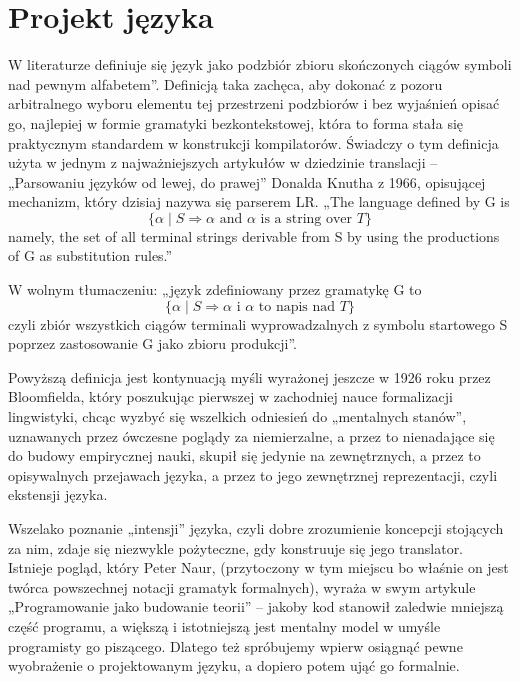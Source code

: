 \chapter{Projekt języka}
\label{cha:wywodJezyka}
W literaturze definiuje się język jako podzbiór zbioru skończonych ciągów symboli nad pewnym alfabetem”\cite{hopcroft_automaty}. Definicją taka zachęca, aby dokonać z pozoru arbitralnego wyboru elementu tej przestrzeni podzbiorów i bez wyjaśnień opisać go, najlepiej w formie gramatyki bezkontekstowej, która to forma stała się praktycznym standardem w konstrukcji kompilatorów. Świadczy o tym definicja użyta w jednym z najważniejszych artykułów w dziedzinie translacji – „Parsowaniu języków od lewej, do prawej” Donalda Knutha z 1966\cite{TRANSLATION_FROM_LEFT_TO_RIGHT}, opisującej mechanizm, który dzisiaj nazywa się parserem LR. 
„The language defined by G is
\[
\{ \alpha \mid S \Rightarrow \alpha \text{ and } \alpha \text{ is a string over } T \}
\]
namely, the set of all terminal strings derivable from S by using the productions of G as substitution rules.”

W wolnym tłumaczeniu:
„język zdefiniowany przez gramatykę G to \[
\{ \alpha \mid S \Rightarrow \alpha \text{ i } \alpha \text{ to napis nad } T \}
\]czyli zbiór wszystkich ciągów terminali wyprowadzalnych z symbolu startowego S poprzez zastosowanie G jako zbioru produkcji”.

Powyższą definicja jest kontynuacją myśli wyrażonej jeszcze w 1926 roku przez Bloomfielda\cite{BLOOMFIELD_1926}, który poszukując pierwszej w zachodniej nauce formalizacji lingwistyki, chcąc wyzbyć się wszelkich odniesień do „mentalnych stanów”, uznawanych przez ówczesne poglądy za niemierzalne, a przez to nienadające się do budowy empirycznej nauki, skupił się jedynie na zewnętrznych, a przez to opisywalnych przejawach języka, a przez to  jego zewnętrznej reprezentacji,  czyli ekstensji języka.\cite{parsing_timeline_kegler}

Wszelako poznanie „intensji” języka, czyli dobre zrozumienie koncepcji stojących za nim, zdaje się niezwykle pożyteczne, gdy konstruuje się jego translator. Istnieje pogląd, który Peter Naur, (przytoczony w tym miejscu bo właśnie on jest twórca powszechnej notacji gramatyk formalnych), wyraża w swym artykule „Programowanie jako budowanie teorii” – jakoby kod stanowił zaledwie mniejszą część programu, a większą i istotniejszą jest mentalny model w umyśle programisty go piszącego\cite{NAUR_1985}. Dlatego też spróbujemy wpierw osiągnąć pewne wyobrażenie o projektowanym języku, a dopiero potem ująć go formalnie. 

